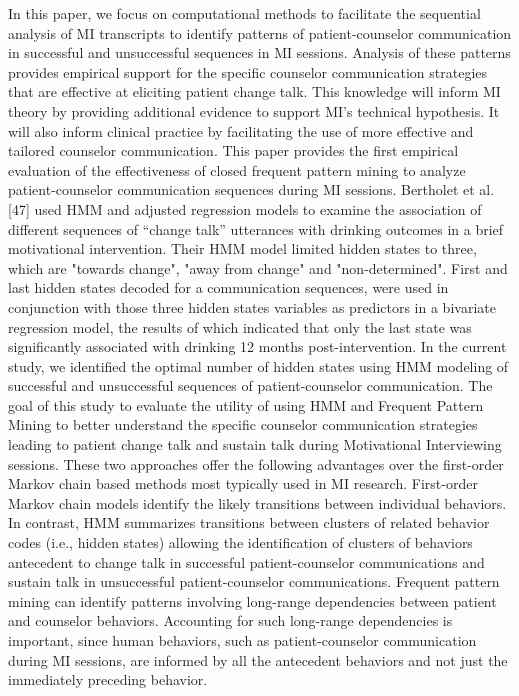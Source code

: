 In this paper, we focus on computational methods to facilitate the sequential analysis of MI transcripts to identify patterns of patient-counselor communication in successful and unsuccessful sequences in MI sessions. Analysis of these patterns provides empirical support for the specific counselor communication strategies that are effective at eliciting patient change talk. This knowledge will inform MI theory by providing additional evidence to support MI’s technical hypothesis. It will also inform clinical practice by facilitating the use of more effective and tailored counselor communication. This paper provides the first empirical evaluation of the effectiveness of closed frequent pattern mining to analyze patient-counselor communication sequences during MI sessions. Bertholet et al. [47] used HMM and adjusted regression models to examine the association of different sequences of “change talk” utterances with drinking outcomes in a brief motivational intervention. Their HMM model limited hidden states to three, which are "towards change", "away from change" and "non-determined". First and last hidden states decoded for a communication sequences, were used in conjunction with those three hidden states variables as predictors in a bivariate regression model, the results of which indicated that only the last state was significantly associated with drinking 12 months post-intervention. In the current study, we identified the optimal number of hidden states using HMM modeling of successful and unsuccessful sequences of patient-counselor communication. The goal of this study to evaluate the utility of using HMM and Frequent Pattern Mining to better understand the specific counselor communication strategies leading to patient change talk and sustain talk during Motivational Interviewing sessions. These two approaches offer the following advantages over the first-order Markov chain based methods most typically used in MI research. First-order Markov chain models identify the likely transitions between individual behaviors. In contrast, HMM summarizes transitions between clusters of related behavior codes (i.e., hidden states) allowing the identification of clusters of behaviors antecedent to change talk in successful patient-counselor communications and sustain talk in unsuccessful patient-counselor communications. Frequent pattern mining can identify patterns involving long-range dependencies between patient and counselor behaviors. Accounting for such long-range dependencies is important, since human behaviors, such as patient-counselor communication during MI sessions, are informed by all the antecedent behaviors and not just the immediately preceding behavior.

